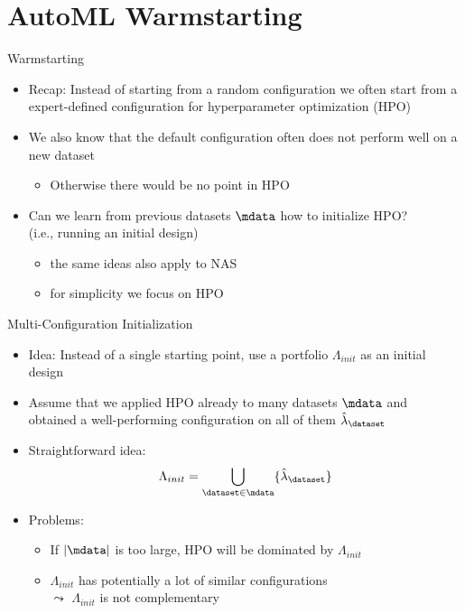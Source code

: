 \section{AutoML Warmstarting}
\begin{frame}[c]{Warmstarting}

\begin{itemize}
	\item Recap: Instead of starting from a random configuration we often start from a expert-defined configuration for hyperparameter optimization (HPO)
	\pause
	\item We also know that the default configuration often does not perform well on a new dataset
	\begin{itemize}
		\item Otherwise there would be no point in HPO
	\end{itemize}
	\pause
	\item \alert{Can we learn from previous datasets $\mdata$ how to initialize HPO?}\\
	(i.e., running an initial design)
	\begin{itemize}
		\item the same ideas also apply to NAS
		\item for simplicity we focus on HPO 
	\end{itemize}
\end{itemize}

\end{frame}
\begin{frame}[c]{Multi-Configuration Initialization}

\begin{itemize}
	\item Idea: Instead of a single starting point, use a \alert{portfolio $\Lambda_{init}$} as an initial design
	\item Assume that we applied HPO already to many datasets $\mdata$ and\\
	obtained a well-performing configuration on all of them $\hat{\lambda}_\dataset$
	\item Straightforward idea: 
	$$\Lambda_{init} = \bigcup_{\dataset \in \mdata} \{ \hat{\lambda}_\dataset \}$$
	\item Problems:
	\begin{itemize}
		\item If $|\mdata|$ is too large, HPO will be dominated by $\Lambda_{init}$
		\item $\Lambda_{init}$ has potentially a lot of similar configurations\\
		$\leadsto$ $\Lambda_{init}$ is not complementary
	\end{itemize}
\end{itemize}


\end{frame}
